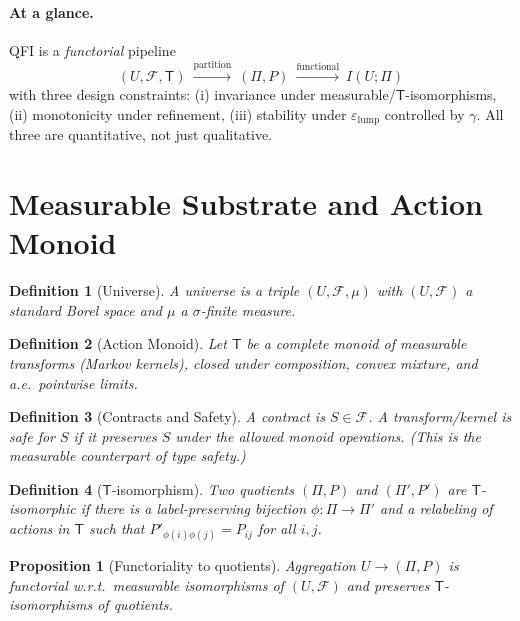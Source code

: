 \documentclass[11pt]{article}
\newcommand{\gap}{\gamma}             %
\newcommand{\1}{\mathbf{1}}
\newtheorem{defn}{Definition}
\newtheorem{prop}{Proposition}
\begin{document}
\paragraph{At a glance.} QFI is a \emph{functorial} pipeline
\[
(U,\mathcal F,\mathsf T)\ \xrightarrow{\text{partition}}\ (\Pi,P)\ \xrightarrow{\text{functional}}\ I(U;\Pi)
\]
with three design constraints: (i) invariance under measurable/$\mathsf T$-isomorphisms, (ii) monotonicity under refinement, (iii) stability under $\varepsilon_{\mathrm{lump}}$ controlled by $\gap$.
All three are quantitative, not just qualitative.

\section{Measurable Substrate and Action Monoid}
\begin{defn}[Universe]
A \emph{universe} is a triple $(U,\mathcal F,\mu)$ with $(U,\mathcal F)$ a standard Borel space\cite{Kallenberg2002} and $\mu$ a $\sigma$-finite measure.
\end{defn}

\begin{defn}[Action Monoid]
Let $\mathsf T$ be a \emph{complete monoid} of measurable transforms (Markov kernels)\cite{Kallenberg2002}, closed under composition, convex mixture, and a.e.\ pointwise limits.
\end{defn}

\begin{defn}[Contracts and Safety]
A \emph{contract} is $S\in\mathcal F$. A transform/kernel is \emph{safe for $S$} if it preserves $S$ under the allowed monoid operations. (This is the measurable counterpart of type safety.)
\end{defn}

\begin{defn}[$\mathsf T$-isomorphism]
Two quotients $(\Pi,P)$ and $(\Pi',P')$ are \emph{$\mathsf T$-isomorphic} if there is a label-preserving bijection $\phi:\Pi\!\to\!\Pi'$ and a relabeling of actions in $\mathsf T$ such that $P'_{\phi(i)\phi(j)}=P_{ij}$ for all $i,j$.
\end{defn}

\begin{prop}[Functoriality to quotients] %
Aggregation $U\to(\Pi,P)$ is functorial w.r.t.\ measurable isomorphisms of $(U,\mathcal F)$ and preserves $\mathsf T$-isomorphisms of quotients.
\end{prop}
\end{document}
